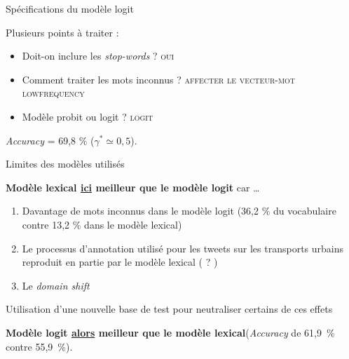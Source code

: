 \documentclass[10pt,xcolor=table,color={dvipsnames,usenames},ignorenonframetext,usepdftitle=false,french]{beamer}
\providecommand{\tightlist}{%
  \setlength{\parskip}{0pt}
  }
\begin{document}
\begin{frame}{Spécifications du modèle logit}
\protect\hypertarget{spuxe9cifications-du-moduxe8le-logit}{}

Plusieurs points à traiter :

\begin{itemize}
\item
  Doit-on inclure les \emph{stop-words} ? \textsc{oui}
\item
  Comment traiter les mots inconnus ?
  \textsc{affecter le vecteur-mot lowfrequency}
\item
  Modèle probit ou logit ? \textsc{logit}
\end{itemize}

\bigskip

\bigskip

\faArrowCircleRight{} \emph{Accuracy} = 69,8 \%
(\(\gamma^* \simeq 0,5\)).

\end{frame}

\begin{frame}{Limites des modèles utilisés}
\protect\hypertarget{limites-des-moduxe8les-utilisuxe9s}{}

\textbf{Modèle lexical \underline{ici} meilleur que le modèle logit} car
\dots

\begin{enumerate}
\tightlist
\item
  Davantage de mots inconnus dans le modèle logit (36,2 \% du
  vocabulaire contre 13,2 \% dans le modèle lexical)
\end{enumerate}

\pause

\begin{enumerate}
\setcounter{enumi}{1}
\tightlist
\item
  Le processus d'annotation utilisé pour les tweets sur les transports
  urbains reproduit en partie par le modèle lexical ( ? )
\end{enumerate}

\pause

\begin{enumerate}
\setcounter{enumi}{2}
\tightlist
\item
  Le \emph{domain shift}
\end{enumerate}

\pause

\bigskip

\faArrowCircleRight{} Utilisation d'une nouvelle base de test pour
neutraliser certains de ces effets

\textbf{Modèle logit \underline{alors} meilleur que le modèle
lexical}\newline(\emph{Accuracy} de 61,9~\% contre 55,9~\%).

\end{frame}
\end{document}
